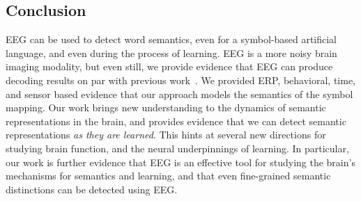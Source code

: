 
\subsection{Conclusion}
EEG can be used to detect word semantics, even for a symbol-based artificial language, and even during the process of learning.  EEG is a more noisy brain imaging modality, but even still, we provide evidence that EEG can produce decoding results on par with previous work~\cite{Mitchell2008}. We provided ERP, behavioral, time, and sensor based evidence that our approach models the semantics of the symbol mapping. Our work brings new understanding to the dynamics of semantic representations in the brain, and provides evidence that we can detect semantic representations \emph{as they are learned}.  This hints at several new directions for studying brain function, and the neural underpinnings of learning.  In particular, our work is further evidence that EEG is an effective tool for studying the brain's mechanisms for semantics and learning, and that even fine-grained semantic distinctions can be detected using EEG.


